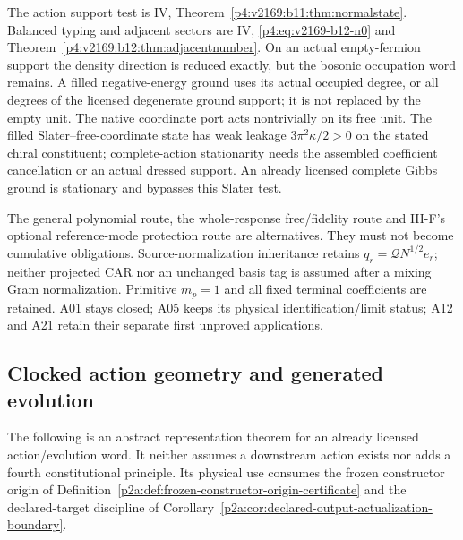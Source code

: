 \documentclass[12pt,a4paper]{article}
\begin{document}
The action support test is IV,
Theorem~\ref{p4:v2169:b11:thm:normalstate}. Balanced typing and adjacent
sectors are IV, \eqref{p4:eq:v2169-b12-n0} and
Theorem~\ref{p4:v2169:b12:thm:adjacentnumber}.
On an actual empty-fermion support the density direction is reduced exactly,
but the bosonic occupation word remains. A filled negative-energy ground
uses its actual occupied degree, or all degrees of the licensed degenerate
ground support; it is not replaced by the empty unit. The native coordinate
port acts nontrivially on its free unit. The filled Slater--free-coordinate
state has weak leakage $3\pi^2\kappa/2>0$ on the stated chiral constituent;
complete-action stationarity needs the assembled coefficient cancellation or
an actual dressed support. An already licensed complete Gibbs ground is
stationary and bypasses this Slater test.

The general polynomial route, the whole-response free/fidelity route and
III-F's optional reference-mode protection route are alternatives. They
must not become cumulative obligations. Source-normalization inheritance
retains $q_r=\mathcal QN^{1/2}e_r$; neither projected CAR nor an unchanged
basis tag is assumed after a mixing Gram normalization. Primitive $m_p=1$
and all fixed terminal coefficients are retained. A01 stays closed;
A05 keeps its physical identification/limit status; A12 and A21 retain
their separate first unproved applications.




\subsection{Clocked action geometry and generated evolution}
\label{p2a:sec:v2190-clocked-action-evolution}

The following is an abstract representation theorem for an already licensed
action/evolution word.  It neither assumes a downstream action exists nor
adds a fourth constitutional principle.  Its physical use consumes the
frozen constructor origin of Definition~\ref{p2a:def:frozen-constructor-origin-certificate}
and the declared-target discipline of
Corollary~\ref{p2a:cor:declared-output-actualization-boundary}.
\end{document}
